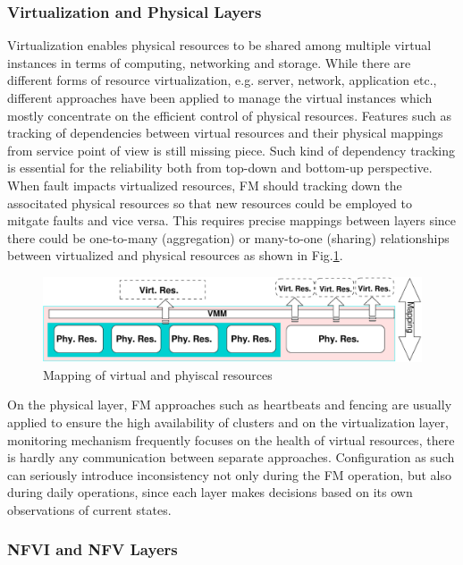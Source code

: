 \subsubsection{Virtualization and Physical Layers}

Virtualization enables physical resources to be shared among multiple virtual
instances in terms of computing, networking and storage. While there are
different forms of resource virtualization, e.g. server, network, application
etc., different approaches have been applied to manage the virtual instances
which mostly concentrate on the efficient control of physical resources.
Features such as tracking of dependencies between virtual resources and their
physical mappings from service point of view is still missing piece.  Such kind
of dependency tracking is essential for the reliability both from top-down and
bottom-up perspective. When fault impacts virtualized resources, FM should
tracking down the associtated physical resources so that new resources could be
employed to mitgate faults and vice versa. This requires precise mappings
between layers since there could be one-to-many (aggregation) or many-to-one
(sharing) relationships between virtualized and physical resources as shown in
Fig.\ref{fig:mapping}.  
 
\begin{figure}[ht]
	\centering
	\includegraphics[scale=0.52]{fig/mapping.pdf}
	\caption{Mapping of virtual and phyiscal resources}
	\label{fig:mapping}
\end{figure}

On the physical layer, FM approaches such as heartbeats and fencing are usually
applied to ensure the high availability of clusters and on the virtualization
layer, monitoring mechanism frequently focuses on the health of virtual
resources, there is hardly any communication between separate approaches.
Configuration as such can seriously introduce inconsistency not only during the
FM operation, but also during daily operations, since each layer makes decisions
based on its own observations of current states.  

\subsubsection{NFVI and NFV Layers}

